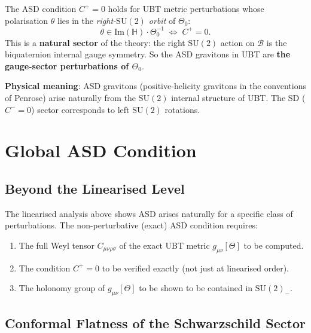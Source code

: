 \documentclass[11pt,a4paper]{article}
\theoremstyle{definition}
\theoremstyle{remark}
\begin{document}
\begin{tcolorbox}[colback=blue!5!white,colframe=blue!75!black,
                  title={Key Finding}]
The ASD condition $C^+ = 0$ holds for UBT metric perturbations whose
polarisation $\theta$ lies in the \emph{right-$\mathrm{SU}(2)$ orbit} of
$\Theta_0$:
\[
  \theta \in \mathrm{Im}(\mathbb{H})\cdot\Theta_0^{-1}
  \;\Longleftrightarrow\;
  C^+ = 0.
\]
This is a \textbf{natural sector} of the theory: the right $\mathrm{SU}(2)$
action on $\mathcal{B}$ is the biquaternion internal gauge symmetry.  So
the ASD gravitons in UBT are \textbf{the gauge-sector perturbations of
$\Theta_0$}.

\medskip
\textbf{Physical meaning}: ASD gravitons (positive-helicity gravitons in the
conventions of Penrose) arise naturally from the $\mathrm{SU}(2)$ internal
structure of UBT.  The SD ($C^- = 0$) sector corresponds to left
$\mathrm{SU}(2)$ rotations.
\end{tcolorbox}

\section{Global ASD Condition}
\label{sec:global}

\subsection{Beyond the Linearised Level}

The linearised analysis above shows ASD arises naturally for a specific class
of perturbations.  The non-perturbative (exact) ASD condition requires:

\begin{enumerate}
  \item The full Weyl tensor $C_{\mu\nu\rho\sigma}$ of the exact
        UBT metric $g_{\mu\nu}[\Theta]$ to be computed.
  \item The condition $C^+ = 0$ to be verified exactly (not just at
        linearised order).
  \item The holonomy group of $g_{\mu\nu}[\Theta]$ to be shown to be
        contained in $\mathrm{SU}(2)_-$.
\end{enumerate}

\subsection{Conformal Flatness of the Schwarzschild Sector}
\end{document}

